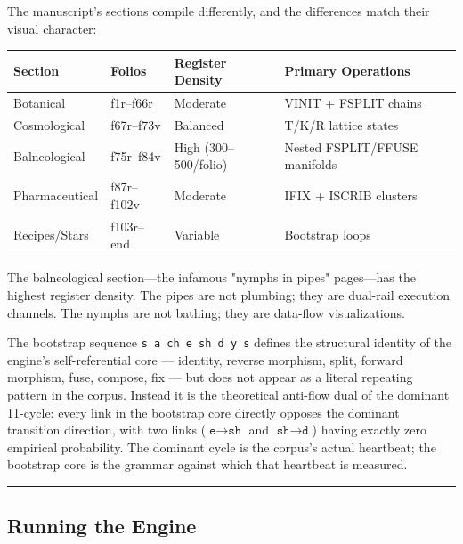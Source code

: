 \documentclass[12pt,a4paper]{article}
\begin{document}
The manuscript's sections compile differently, and the differences match their visual character:

\begin{table}[htbp]
\centering
\small
{}
\begin{tabularx}{\textwidth}{>{\centering\arraybackslash}X >{\centering\arraybackslash}X >{\centering\arraybackslash}X >{\centering\arraybackslash}X}
\toprule
\rowcolor{gray!25}\textbf{Section} & \textbf{Folios} & \textbf{Register Density} & \textbf{Primary Operations} \\
\midrule
\rowcolors{1}{white}{gray!10}
Botanical & f1r--f66r & Moderate & VINIT + FSPLIT chains \\
Cosmological & f67r--f73v & Balanced & T/K/R lattice states \\
Balneological & f75r--f84v & High (300--500/folio) & Nested FSPLIT/FFUSE manifolds \\
Pharmaceutical & f87r--f102v & Moderate & IFIX + ISCRIB clusters \\
Recipes/Stars & f103r--end & Variable & Bootstrap loops \\
\bottomrule
\end{tabularx}
\end{table}

The balneological section---the infamous "nymphs in pipes" pages---has the highest register density. The pipes are not plumbing; they are dual-rail execution channels. The nymphs are not bathing; they are data-flow visualizations.

The bootstrap sequence \texttt{s a ch e sh d y s} defines the structural identity of the engine's self-referential core --- identity, reverse morphism, split, forward morphism, fuse, compose, fix --- but does not appear as a literal repeating pattern in the corpus. Instead it is the theoretical anti-flow dual of the dominant 11-cycle: every link in the bootstrap core directly opposes the dominant transition direction, with two links ($\texttt{e} \to \texttt{sh}$ and $\texttt{sh} \to \texttt{d}$) having exactly zero empirical probability. The dominant cycle is the corpus's actual heartbeat; the bootstrap core is the grammar against which that heartbeat is measured.

\begin{center}
\rule{0.5\textwidth}{0.4pt}
\end{center}

\subsection{Running the Engine}
\end{document}
